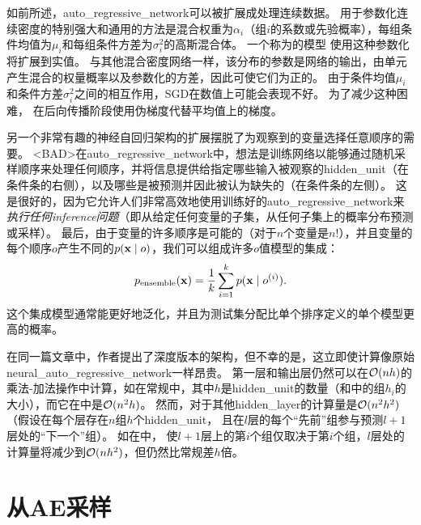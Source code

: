 如前所述，\gls{auto_regressive_network}可以被扩展成处理连续数据。
用于参数化连续密度的特别强大和通用的方法是混合权重为$\alpha_i$（组$i$的系数或先验概率），每组条件均值为$\mu_i$和每组条件方差为$\sigma_i^2$的高斯混合体。
一个称为的模型\citep{Benigno-et-al-NIPS2013-small} 使用这种参数化将扩展到实值。
与其他混合密度网络一样，该分布的参数是网络的输出，由单元产生混合的权量概率以及参数化的方差，因此可使它们为正的。
由于条件均值$\mu_i$和条件方差$\sigma_i^2$之间的相互作用，\gls{SGD}在数值上可能会表现不好。
为了减少这种困难， \citet{Benigno-et-al-NIPS2013-small}在后向传播阶段使用伪梯度代替平均值上的梯度。

另一个非常有趣的神经自回归架构的扩展摆脱了为观察到的变量选择任意顺序的需要\citep{Uria+al-ICML2014}。
<BAD>在\gls{auto_regressive_network}中，想法是训练网络以能够通过随机采样顺序来处理任何顺序，并将信息提供给指定哪些输入被观察的\gls{hidden_unit}（在条件条的右侧），以及哪些是被预测并因此被认为缺失的（在条件条的左侧）。
这是很好的，因为它允许人们非常高效地使用训练好的\gls{auto_regressive_network}来\emph{执行任何\gls{inference}问题}（即从给定任何变量的子集，从任何子集上的概率分布预测或采样）。
最后，由于变量的许多顺序是可能的（对于$n$个变量是$n!$），并且变量的每个顺序$o$产生不同的$p(\mathbf{x} \mid o)$，我们可以组成许多$o$值模型的集成：
\begin{align}
 p_{\text{ensemble}}(\mathbf{x}) = \frac{1}{k} \sum_{i=1}^k p(\mathbf{x}  \mid  o^{(i)}).
\end{align}
这个集成模型通常能更好地泛化，并且为测试集分配比单个排序定义的单个模型更高的概率。


在同一篇文章中，作者提出了深度版本的架构，但不幸的是，这立即使计算像原始\gls{neural_auto_regressive_network}一样昂贵\citep{Bengio+Bengio-NIPS2000}。
第一层和输出层仍然可以在$\mathcal{O}(nh)$的乘法-加法操作中计算，如在常规中，其中$h$是\gls{hidden_unit}的数量（和中的组$h_i$的大小），而它在\citet{Bengio+Bengio-NIPS2000}中是$\mathcal{O}(n^2h)$。
然而，对于其他\gls{hidden_layer}的计算量是$\mathcal{O}(n^2 h^2)$（假设在每个层存在$n$组$h$个\gls{hidden_unit}， 且在$l$层的每个``先前''组参与预测$l+1$层处的``下一个''组）。
如在\citet{Uria+al-ICML2014}中， 使$l+1$层上的第$i$个组仅取决于第$i$个组，$l$层处的计算量将减少到$\mathcal{O}(nh^2)$，但仍然比常规差$h$倍。


\section{从\gls{AE}采样}
\label{sec:drawing_samples_from_autoencoders}

